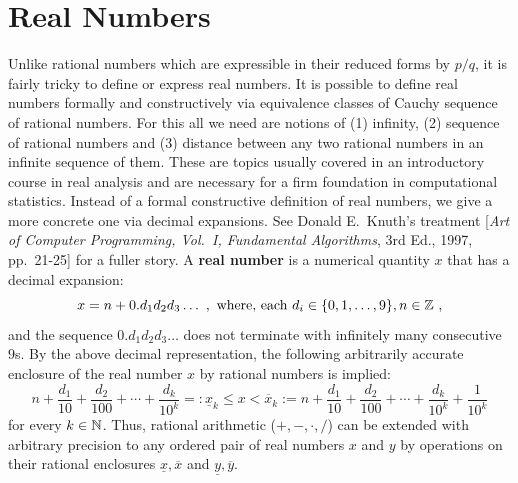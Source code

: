 \section{Real Numbers}\label{S:Reals}
Unlike rational numbers which are expressible in their reduced forms by $p/q$, it is fairly tricky to define or express real numbers.  It is possible to define real numbers formally and constructively via equivalence classes of Cauchy sequence of rational numbers.  For this all we need are notions of (1) infinity, (2) sequence of rational numbers and (3) distance between any two rational numbers in an infinite sequence of them.  These are topics usually covered in an introductory course in real analysis and are necessary for a firm  foundation in computational statistics.  Instead of a formal constructive definition of real numbers, we give a more concrete one via decimal expansions.  See Donald E.~Knuth's treatment [{\em Art of Computer Programming, Vol.~I, Fundamental Algorithms}, 3rd Ed., 1997, pp.~21-25] for a fuller story.  A {\bf real number} is a numerical quantity $x$ that has a decimal expansion:
\[
x = n+ 0.d_1d_2d_3 \ldots \ , \text{ where, each } d_i \in \{0,1,\ldots,9\}, n \in \mathbb{Z} \ ,
\]
and the sequence $ 0.d_1d_2d_3 \ldots$ does not terminate with infinitely many consecutive $9$s.  By the above decimal representation, the following arbitrarily accurate enclosure of the real number $x$ by rational numbers is implied:
\[
n+\frac{d_1}{10}+\frac{d_2}{100}+\cdots+\frac{d_k}{10^k} =: \underline{x}_k \leq x < \overline{x}_k :=
n+\frac{d_1}{10}+\frac{d_2}{100}+\cdots+\frac{d_k}{10^k}+\frac{1}{10^k}
\]
for every $k \in \mathbb{N}$.  Thus, rational arithmetic ($+,-,\cdot,/$) can be extended with arbitrary precision to any ordered pair of real numbers $x$ and $y$ by operations on their rational enclosures $\underline{x}, \overline{x}$ and $\underline{y}, \overline{y}$.

